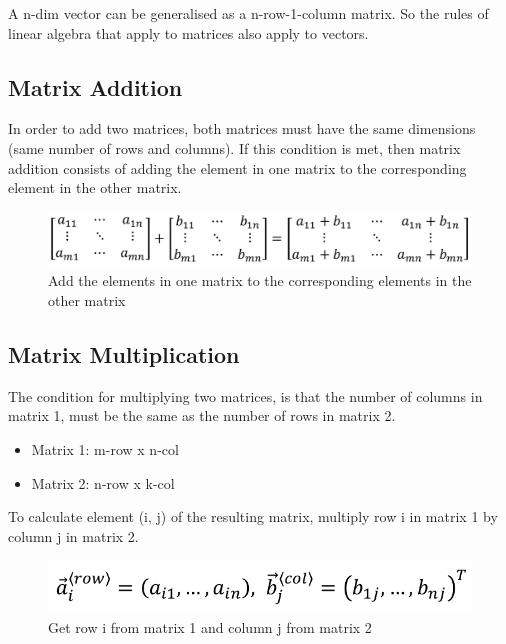 \documentclass[
]{book}
\providecommand{\tightlist}{%
  \setlength{\itemsep}{0pt}\setlength{\parskip}{0pt}}
\begin{document}
A {n-dim} {vector} can be generalised as a {n-row-1-column} {matrix}. So the rules of linear algebra that apply to matrices also apply to vectors.

\hypertarget{matrix-addition}{%
\subsection{Matrix Addition}\label{matrix-addition}}

In order to add two matrices, both matrices must have the same dimensions (same number of rows and columns). If this condition is met, then matrix addition consists of adding the element in one matrix to the corresponding element in the other matrix.

\begin{figure}
\centering
\includegraphics{img/08-image08.png}
\caption{\label{fig:matrix-addition}Add the elements in one matrix to the corresponding elements in the other matrix}
\end{figure}

\hypertarget{matrix-multiplication}{%
\subsection{Matrix Multiplication}\label{matrix-multiplication}}

The condition for multiplying two matrices, is that the number of columns in matrix 1, must be the same as the number of rows in matrix 2.

\begin{itemize}
\tightlist
\item
  Matrix 1: {m}-row x {n}-col
\item
  Matrix 2: {n}-row x {k}-col
\end{itemize}

To calculate element (i, j) of the resulting matrix, multiply row i in matrix 1 by column j in matrix 2.

\begin{figure}
\centering
\includegraphics{img/08-image09.png}
\caption{\label{fig:matrix-mult1}Get row i from matrix 1 and column j from matrix 2}
\end{figure}
\end{document}
